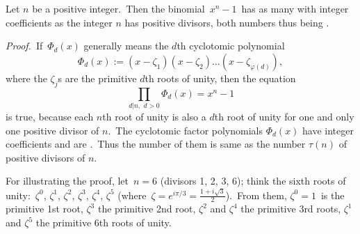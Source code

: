 \documentclass[12pt]{article}
\theoremstyle{definition}
\begin{document}


Let $n$ be a positive integer.\, Then the binomial\, $x^n\!-\!1$\, has as many  with integer coefficients as the integer $n$ has positive divisors, both numbers thus being .

{\em Proof.}\, If\, $\Phi_d(x)$ generally means the $d$th cyclotomic polynomial
$$\Phi_d(x) := (x-\zeta_1)(x-\zeta_2)\ldots(x-\zeta_{\varphi(d)}),$$
where the $\zeta_j$s are the primitive $d$th roots of unity, then the equation
           $$\prod_{d|n,\,\,d>0}\!\Phi_d(x) = x^n\!-\!1$$
is true, because each $n$th root of unity is also a  $d$th root of unity for one and only one positive divisor of $n$.\, The cyclotomic factor polynomials $\Phi_d(x)$ have integer coefficients and are .\, Thus the number of them is same as the number $\tau(n)$ of positive divisors of $n$.

For illustrating the proof, let\, $n = 6$ (divisors 1, 2, 3, 6); think the sixth roots of unity:\, $\zeta^0$, $\zeta^1$, $\zeta^2$, $\zeta^3$, $\zeta^4$, $\zeta^5$
(where\, $\zeta = e^{i\pi/3} = \frac{1+i\sqrt{3}}{2}$).\, From them, $\zeta^0 = 1$\, is the primitive 1st root, $\zeta^3$ the primitive 2nd root, $\zeta^2$ and $\zeta^4$ the primitive 3rd roots, $\zeta^1$ and $\zeta^5$ the primitive 6th roots of unity.


\end{document}
